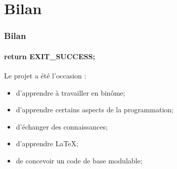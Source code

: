 \documentclass{beamer}
\begin{document}
    \section{Bilan}
    \begin{frame}
    \frametitle{Bilan}
    \framesubtitle{return EXIT\_SUCCESS;}
        Le projet a été l'occasion :
        \begin{itemize}
            \item d'apprendre à travailler en binôme;
            \item d'apprendre certains aspects de la programmation;
            \item d'échanger des connaissances;
            \item d'apprendre \LaTeX;
            \item de concevoir un code de base modulable;
        \end{itemize}

    \end{frame}



\end{document}
